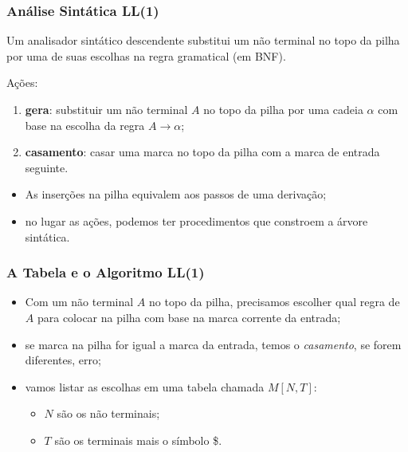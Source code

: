 \documentclass[table]{beamer}
\begin{document}
\begin{frame}
   \frametitle{Análise Sintática LL(1)}
   Um analisador sintático descendente substitui um não terminal no topo da pilha por uma de suas escolhas na regra gramatical (em BNF).
   \begin{block}{Ações:}
      \begin{enumerate}
         \item \textbf{gera}: substituir um não terminal $A$ no topo da pilha por uma cadeia $\alpha$ com base na escolha da regra $A\to\alpha$;
	 \item \textbf{casamento}: casar uma marca no topo da pilha com a marca de entrada seguinte.
      \end{enumerate}
   \end{block}
   \begin{itemize}
      \item As inserções na pilha equivalem aos passos de uma derivação;
      \item no lugar as ações, podemos ter procedimentos que constroem a árvore sintática.
   \end{itemize}
\end{frame}

\begin{frame}
   \frametitle{A Tabela e o Algoritmo LL(1)}
   \begin{itemize}
      \item Com um não terminal $A$ no topo da pilha, precisamos escolher qual regra de $A$ para colocar na pilha com base na marca corrente da entrada;
      \item se marca na pilha for igual a marca da entrada, temos o \textit{casamento}, se forem diferentes, erro;
      \item vamos listar as escolhas em uma tabela chamada $M[N, T]$:
      \begin{itemize}
         \item $N$ são os não terminais;
	 \item $T$ são os terminais mais o símbolo \$.
      \end{itemize}
   \end{itemize}
\end{frame}
\end{document}
